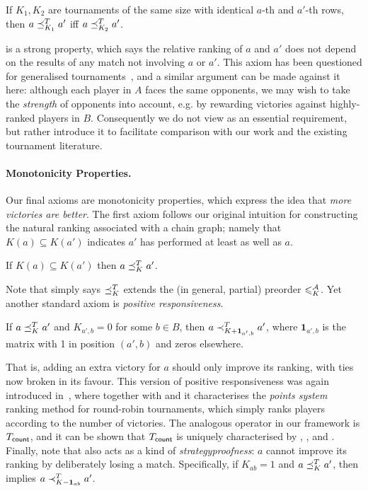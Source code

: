 \begin{axiom}[\iim{}]

    If $K_1, K_2$ are tournaments of the same size with identical $a$-th and
    $a'$-th rows, then $a \preceq_{K_1}^T a'$ iff $a \preceq_{K_2}^T a'$.

\end{axiom}

\iim{} is a strong property, which says the relative ranking of $a$ and
$a'$ does not depend on the results of any match not involving $a$ or $a'$.
This axiom has been questioned for generalised
tournaments~\cite{gonzalez2014paired}, and a similar argument can be made
against it here: although each player in $A$ faces the same opponents, we may
wish to take the \emph{strength} of opponents into account, e.g. by rewarding
victories against highly-ranked players in $B$. Consequently we do not view
\iim{} as an essential requirement, but rather introduce it to
facilitate comparison with our work and the existing tournament literature.

\paragraph{Monotonicity Properties.}
%
Our final axioms are monotonicity properties, which express the idea that
\emph{more victories are better}. The first axiom follows our original
intuition for constructing the natural ranking associated with a chain graph;
namely that $K(a) \subseteq K(a')$ indicates $a'$ has performed at least as
well as $a$.

\begin{axiom}[\mon{}]
    If $K(a) \subseteq K(a')$ then $a \preceq_K^T a'$.
\end{axiom}

Note that \mon{} simply says ${\preceq_K^T}$ extends the (in general,
partial) preorder ${\leqslant^{\mathcal{A}}_K}$.
%
Yet another standard axiom is \emph{positive responsiveness}.

\begin{axiom}[\posresp{}]

    If $a \preceq_K^T a'$ and $K_{a',b} = 0$ for some $b \in B$, then $a
    \prec_{K + \bm{1}_{a', b}}^T a'$, where $\bm{1}_{a', b}$ is the matrix
    with 1 in position $(a', b)$ and zeros elsewhere.

\end{axiom}

That is, adding an extra victory for $a$ should only improve its ranking, with
ties now broken in its favour. This version of positive responsiveness was
again introduced in~\cite{rubinstein1980ranking}, where together with
\anon{} and \iim{} it characterises the \emph{points system}
ranking method for round-robin tournaments, which simply ranks players
according to the number of victories. The analogous operator in our framework
is ${T_{\mathsf{count}}}$, and it can be shown that ${T_{\mathsf{count}}}$ is uniquely characterised
by \anon{}, \iim{}, \posresp{} and \dualaxiom{}.
%
Finally, note that \posresp{} also acts as a kind of
\emph{strategyproofness}: $a$ cannot improve its ranking by deliberately losing
a match. Specifically, if $K_{ab} = 1$ and $a \preceq_K^T a'$, then
\posresp{} implies $a \prec_{K - \bm{1}_{ab}}^T a'$.

